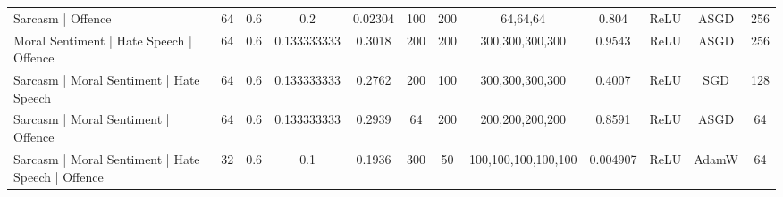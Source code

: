 {\begin{landscape}
\begin{table}[]
{\begin{tabular}{l|ccccccccccc}
      Sarcasm | Offence                                                  & 64         & 0.6              & 0.2              & 0.02304 & 100           & 200    & 64,64,64                & 0.804         & ReLU          & ASGD      & 256        \\
      Moral Sentiment | Hate Speech | Offence                            & 64         & 0.6              & 0.133333333      & 0.3018  & 200           & 200    & 300,300,300,300         & 0.9543        & ReLU          & ASGD      & 256        \\
      Sarcasm | Moral Sentiment | Hate Speech                            & 64         & 0.6              & 0.133333333      & 0.2762  & 200           & 100    & 300,300,300,300         & 0.4007        & ReLU          & SGD       & 128        \\
      Sarcasm | Moral Sentiment | Offence                                & 64         & 0.6              & 0.133333333      & 0.2939  & 64            & 200    & 200,200,200,200         & 0.8591        & ReLU          & ASGD      & 64         \\
      Sarcasm | Moral Sentiment | Hate Speech | Offence                  & 32         & 0.6              & 0.1              & 0.1936  & 300           & 50     & 100,100,100,100,100     & 0.004907      & ReLU          & AdamW     & 64         \\

\end{tabular}}
\end{table}
\end{landscape}}
